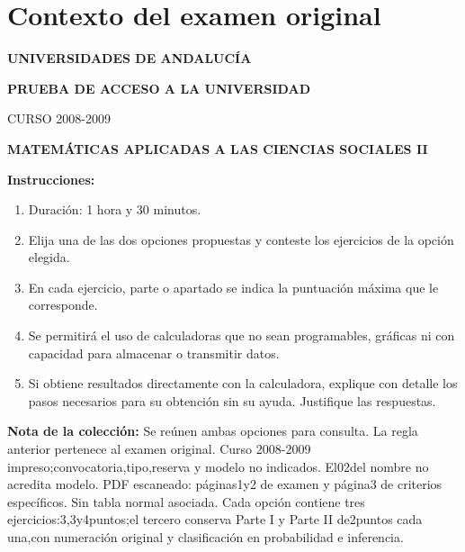 \section*{Contexto del examen original}
\textbf{UNIVERSIDADES DE ANDALUCÍA}\par
\textbf{PRUEBA DE ACCESO A LA UNIVERSIDAD}\par
CURSO 2008-2009\par
\textbf{MATEMÁTICAS APLICADAS A LAS CIENCIAS SOCIALES II}

\textbf{Instrucciones:}
\begin{enumerate}[label=\textbf{\alph*)}]
  \item Duración: 1 hora y 30 minutos.
  \item Elija una de las dos opciones propuestas y conteste los ejercicios de la opción elegida.
  \item En cada ejercicio, parte o apartado se indica la puntuación máxima que le corresponde.
  \item Se permitirá el uso de calculadoras que no sean programables, gráficas ni con capacidad para almacenar o transmitir datos.
  \item Si obtiene resultados directamente con la calculadora, explique con detalle los pasos necesarios para su obtención sin su ayuda. Justifique las respuestas.
\end{enumerate}
\noindent\textbf{Nota de la colección:} Se reúnen ambas opciones para consulta. La regla anterior pertenece al examen original. Curso 2008-2009 impreso;convocatoria,tipo,reserva y modelo no indicados. El02del nombre no acredita modelo. PDF escaneado: páginas1y2 de examen y página3 de criterios específicos. Sin tabla normal asociada. Cada opción contiene tres ejercicios:3,3y4puntos;el tercero conserva Parte I y Parte II de2puntos cada una,con numeración original y clasificación en probabilidad e inferencia.
\par\medskip
